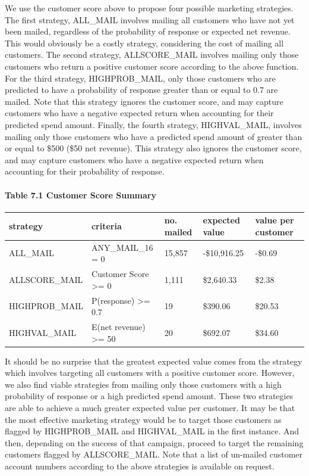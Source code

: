 \documentclass[]{article}
\let\oldparagraph\paragraph
\renewcommand{\paragraph}[1]{\oldparagraph{#1}\mbox{}}
\begin{document}
We use the customer score above to propose four possible marketing
strategies. The first strategy, ALL\_MAIL involves mailing all customers
who have not yet been mailed, regardless of the probability of response
or expected net revenue. This would obviously be a costly strategy,
considering the cost of mailing all customers. The second strategy,
ALLSCORE\_MAIL involves mailing only those customers who return a
positive customer score according to the above function. For the third
strategy, HIGHPROB\_MAIL, only those customers who are predicted to have
a probability of response greater than or equal to 0.7 are mailed. Note
that this strategy ignores the customer score, and may capture customers
who have a negative expected return when accounting for their predicted
spend amount. Finally, the fourth strategy, HIGHVAL\_MAIL, involves
mailing only those customers who have a predicted spend amount of
greater than or equal to \$500 (\$50 net revenue). This strategy also
ignores the customer score, and may capture customers who have a
negative expected return when accounting for their probability of
response.

\paragraph{Table 7.1 Customer Score
Summary}\label{table-7.1-customer-score-summary}

\begin{longtable}[]{@{}lllll@{}}
\toprule
strategy & criteria & no. mailed & expected value & value per
customer\tabularnewline
\midrule
\endhead
ALL\_MAIL & ANY\_MAIL\_16 = 0 & 15,857 & -\$10,916.25 &
-\$0.69\tabularnewline
ALLSCORE\_MAIL & Customer Score \textgreater{}= 0 & 1,111 & \$2,640.33 &
\$2.38\tabularnewline
HIGHPROB\_MAIL & P(response) \textgreater{}= 0.7 & 19 & \$390.06 &
\$20.53\tabularnewline
HIGHVAL\_MAIL & E(net revenue) \textgreater{}= 50 & 20 & \$692.07 &
\$34.60\tabularnewline
\bottomrule
\end{longtable}

It should be no surprise that the greatest expected value comes from the
strategy which involves targeting all customers with a positive customer
score. However, we also find viable strategies from mailing only those
customers with a high probability of response or a high predicted spend
amount. These two strategies are able to achieve a much greater expected
value per customer. It may be that the most effective marketing strategy
would be to target those customers as flagged by HIGHPROB\_MAIL and
HIGHVAL\_MAIL in the first instance. And then, depending on the success
of that campaign, proceed to target the remaining customers flagged by
ALLSCORE\_MAIL. Note that a list of un-mailed customer account numbers
according to the above strategies is available on request.
\end{document}
